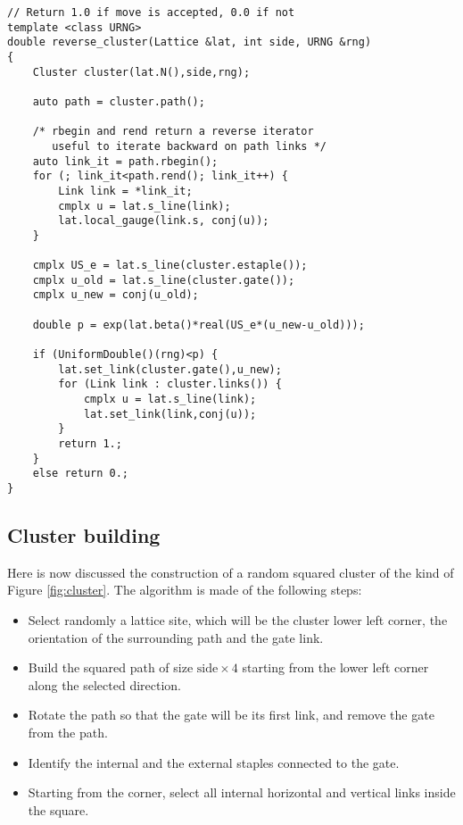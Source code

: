 \begin{lstlisting}[caption={Reverse cluster update}]
// Return 1.0 if move is accepted, 0.0 if not
template <class URNG>
double reverse_cluster(Lattice &lat, int side, URNG &rng)
{
    Cluster cluster(lat.N(),side,rng);

    auto path = cluster.path();

    /* rbegin and rend return a reverse iterator
       useful to iterate backward on path links */
    auto link_it = path.rbegin();
    for (; link_it<path.rend(); link_it++) {
        Link link = *link_it;
        cmplx u = lat.s_line(link);
        lat.local_gauge(link.s, conj(u));
    }

    cmplx US_e = lat.s_line(cluster.estaple());
    cmplx u_old = lat.s_line(cluster.gate());
    cmplx u_new = conj(u_old);

    double p = exp(lat.beta()*real(US_e*(u_new-u_old)));

    if (UniformDouble()(rng)<p) {
        lat.set_link(cluster.gate(),u_new);
        for (Link link : cluster.links()) {
            cmplx u = lat.s_line(link);
            lat.set_link(link,conj(u));
        }
        return 1.;
    }
    else return 0.;
}
\end{lstlisting}

\subsection*{Cluster building}

Here is now discussed the construction of a random squared cluster of the kind of Figure \ref{fig:cluster}.
The algorithm is made of the following steps:

\begin{itemize}
    \item
        Select randomly a lattice site, which will be the cluster lower left corner,
        the orientation of the surrounding path and the gate link.
    \item
        Build the squared path of size $\mathrm{side}\times 4$ starting from the lower left corner along the selected direction.
    \item
        Rotate the path so that the gate will be its first link,
        and remove the gate from the path.
    \item Identify the internal and the external staples connected to the gate.
    \item
        Starting from the corner, select all internal horizontal and vertical links inside the square.
\end{itemize}

